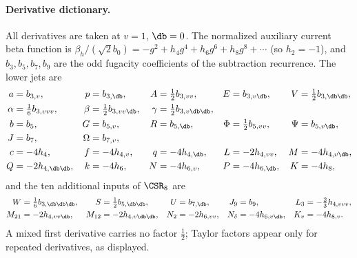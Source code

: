 \paragraph{Derivative dictionary.} All derivatives are taken at $v=1$, $\db=0$. The normalized auxiliary current
beta function is $\beta_h/(\sqrt2b_0)=-g^2+h_4g^4+h_6g^6+h_8g^8+\cdots$ (so $h_2=-1$), and $b_3,b_5,b_7,b_9$ are the odd
fugacity coefficients of the subtraction recurrence. The lower jets are
\begin{equation}
\begin{aligned}
 a&=b_{3,v}, & p&=b_{3,\db}, & A&=\tfrac12b_{3,vv}, & E&=b_{3,v\db}, & V&=\tfrac12b_{3,\db\db},\\
 \alpha&=\tfrac16b_{3,vvv}, & \beta&=\tfrac12b_{3,vv\db}, & \gamma&=\tfrac12b_{3,v\db\db}, && &&\\
 b&=b_5, & G&=b_{5,v}, & R&=b_{5,\db}, & \Phi&=\tfrac12b_{5,vv}, & \Psi&=b_{5,v\db},\\
 J&=b_7, & \Omega&=b_{7,v}, &&&&&&\\
 c&=-4h_4, & f&=-4h_{4,v}, & q&=-4h_{4,\db}, & L&=-2h_{4,vv}, & M&=-4h_{4,v\db},\\
 Q&=-2h_{4,\db\db}, & k&=-4h_6, & N&=-4h_{6,v}, & P&=-4h_{6,\db}, & K&=-4h_8,
\end{aligned}
\end{equation}
and the ten additional inputs of $\CSR_8$ are
\begin{equation}
\begin{aligned}
 W&=\tfrac16b_{3,\db\db\db}, & S&=\tfrac12b_{5,\db\db}, & U&=b_{7,\db}, & J_9&=b_9, & L_3&=-\tfrac23h_{4,vvv},\\
 M_{21}&=-2h_{4,vv\db}, & M_{12}&=-2h_{4,v\db\db}, & N_2&=-2h_{6,vv}, & N_\delta&=-4h_{6,v\db}, & K_v&=-4h_{8,v}.
\end{aligned}
\end{equation}
A mixed first derivative carries no factor $\frac12$; Taylor factors appear only for repeated derivatives, as
displayed.

